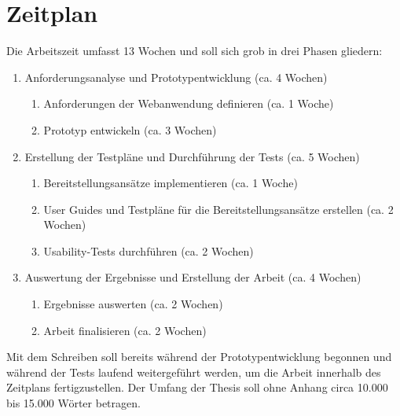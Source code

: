 \documentclass[
    12pt,
    ngerman,
    a4paper,
    oneside
]{book}
\begin{document}
\section*{Zeitplan}
Die Arbeitszeit umfasst 13 Wochen und soll sich grob in drei Phasen gliedern:
\begin{enumerate}[
    label=\Roman*.,
    leftmargin=*,
    itemsep=0.4em,
    topsep=0.4em
]
    \item Anforderungsanalyse und Prototypentwicklung (ca. 4 Wochen)
    \begin{enumerate}[label={-}, itemsep=0.1\baselineskip]
        \item Anforderungen der Webanwendung definieren (ca. 1 Woche)
        \item Prototyp entwickeln (ca. 3 Wochen)
    \end{enumerate}
    \item Erstellung der Testpläne und Durchführung der Tests (ca. 5 Wochen)
    \begin{enumerate}[label={-}, itemsep=0.1\baselineskip]
        \item Bereitstellungsansätze implementieren (ca. 1 Woche)
        \item User Guides und Testpläne für die Bereitstellungsansätze erstellen (ca. 2 Wochen)
        \item Usability-Tests durchführen (ca. 2 Wochen)
    \end{enumerate}
    \item Auswertung der Ergebnisse und Erstellung der Arbeit (ca. 4 Wochen)
    \begin{enumerate}[label={-}, itemsep=0.1\baselineskip]
        \item Ergebnisse auswerten (ca. 2 Wochen)
        \item Arbeit finalisieren (ca. 2 Wochen)
    \end{enumerate}
\end{enumerate}

\noindent Mit dem Schreiben soll bereits während der Prototypentwicklung begonnen und während der Tests laufend weitergeführt werden, um die Arbeit innerhalb des Zeitplans fertigzustellen.
Der Umfang der Thesis soll ohne Anhang circa 10.000 bis 15.000 Wörter betragen.
\end{document}

